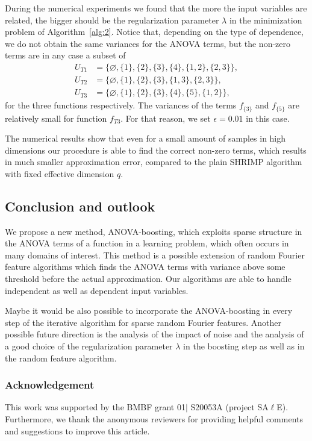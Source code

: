 \documentclass{article}
\theoremstyle{definition}
\numberwithin{equation}{section}
\begin{document}
During the numerical experiments we found that the more the input variables are related, the bigger should be the regularization parameter $\lambda$ in the minimization problem of Algorithm~\ref{alg:2}. 
Notice that, depending on the type of dependence, we do not obtain the same variances for the ANOVA terms, but the non-zero terms are in any case a subset of 
\begin{align}\label{eq:UT1}
U_{T1} &= \{\varnothing,\{1\},\{2\},\{3\},\{4\},\{1,2\},\{2,3\}\},\\
U_{T2} &= \{\varnothing,\{1\},\{2\},\{3\},\{1,3\},\{2,3\}\},\label{eq:UT2}\\
U_{T3} &= \{\varnothing,\{1\},\{2\},\{3\},\{4\},\{5\},\{1,2\}\}\label{eq:UT3},
\end{align}
for the three functions respectively. The variances of the terms $f_{\{3\}}$ and $f_{\{5\}}$ are relatively small for function $f_{T3}$. For that reason, we set $\epsilon = 0.01$ in this case.\par
The numerical results show that even for a small amount of samples in high dimensions our procedure is able to find the correct non-zero terms, which results in much smaller approximation error, compared to the plain SHRIMP algorithm~\cite{Xie22} with fixed effective dimension $q$.


\subsection*{Conclusion and outlook}

We propose a new method, ANOVA-boosting, which exploits sparse structure in the ANOVA terms of a function in a learning problem,
 which often occurs in many domains of interest. 
This method is a possible extension of random Fourier feature algorithms which finds the ANOVA terms with variance above some threshold before the actual approximation. Our algorithms are able to handle independent as well as dependent input variables.\par
Maybe it would be also possible to incorporate the ANOVA-boosting in every step of the iterative algorithm for sparse random Fourier features. 
Another possible future direction is the analysis of the impact of noise and the analysis of a good choice of the regularization parameter $\lambda$ in the boosting step as well as in the random feature algorithm.




\subsubsection*{Acknowledgement}
This work was supported by the BMBF grant 01$\mid$ S20053A (project SA$\ell$E).
Furthermore, we thank the anonymous reviewers
for providing helpful comments and suggestions to improve this article.
\end{document}

